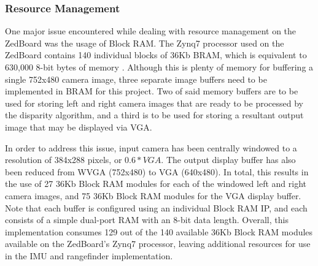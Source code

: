 \subsubsection{Resource Management} \label{dataman}
One major issue encountered while dealing with resource management on the ZedBoard was the usage of Block RAM. The Zynq7 processor used on the ZedBoard contains 140 individual blocks of 36Kb BRAM, which is equivalent to 630,000 8-bit bytes of memory \cite{zynq7bram}. Although this is plenty of memory for buffering a single 752x480 camera image, three separate image buffers need to be implemented in BRAM for this project. Two of said memory buffers are to be used for storing left and right camera images that are ready to be processed by the disparity algorithm, and a third is to be used for storing a resultant output image that may be displayed via VGA.
\par
In order to address this issue, input camera has been centrally windowed to a resolution of 384x288 pixels, or $0.6*VGA$. The output display buffer has also been reduced from WVGA (752x480) to VGA (640x480). In total, this results in the use of 27 36Kb Block RAM modules for each of the windowed left and right camera images, and 75 36Kb Block RAM modules for the VGA display buffer. Note that each buffer is configured using an individual Block RAM IP, and each consists of a simple dual-port RAM with an 8-bit data length. Overall, this implementation consumes 129 out of the 140 available 36Kb Block RAM modules available on the ZedBoard's Zynq7 processor, leaving additional resources for use in the IMU and rangefinder implementation. 